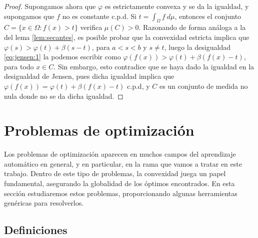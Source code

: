 \documentclass{book}
\begin{document}
\begin{proof}
	Supongamos ahora que $\varphi$ es estrictamente convexa y se da la igualdad, y supongamos que $f$ no es constante c.p.d. Si $t = \int_{\Omega} f \ d\mu$, entonces el conjunto $C = \{x \in \Omega \colon f(x) > t\}$ verifica $\mu(C) > 0$. Razonando de forma análoga a la del lema \ref{lem:secantes}, es posible probar que la convexidad estricta implica que $\varphi(s) > \varphi(t) + \beta(s-t)$, para $a < s < b$ y $s \ne t$, luego la desigualdad \ref{eq:jensen:1} la podemos escribir como $\varphi(f(x)) > \varphi(t) + \beta(f(x) - t)$, para todo $x \in C$. Sin embargo, esto contradice que se haya dado la igualdad en la desigualdad de Jensen, pues dicha igualdad implica que $\varphi(f(x)) = \varphi(t) + \beta(f(x)-t)$ c.p.d, y $C$ es un conjunto de medida no nula donde no se da dicha igualdad.
\end{proof}

\section{Problemas de optimización}

Los problemas de optimización aparecen en muchos campos del aprendizaje automático en general, y en particular, en la rama que vamos a tratar en este trabajo. Dentro de este tipo de problemas, la convexidad juega un papel fundamental, asegurando la globalidad de los óptimos encontrados. En esta sección estudiaremos estos problemas, proporcionando algunas herramientas genéricas para resolverlos.

\subsection{Definiciones}
\end{document}
